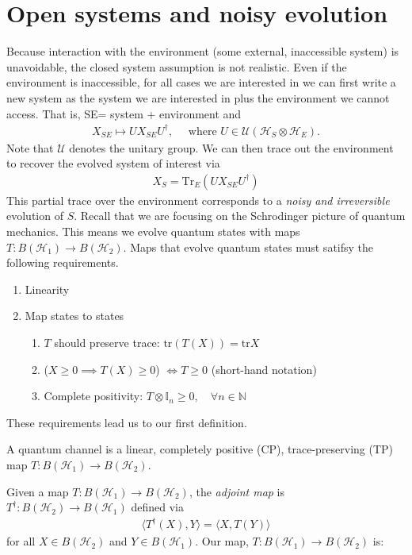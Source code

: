 \documentclass[../../note.tex]{subfiles}
\begin{document}
\section{Open systems and noisy evolution}
Because interaction with the environment (some external, inaccessible system) is unavoidable, the closed system assumption is not realistic. Even if the environment is inaccessible, for all cases we are interested in we can first write a new system as the system we are interested in plus the environment we cannot access. That is, SE= system + environment and 
\begin{align}
X_{SE} \mapsto U X_{SE} U^{\dagger}, \quad \text{ where } U\in \mathcal{U}(\mathcal{H}_S\otimes \mathcal{H}_E).
\end{align}
Note that $\mathcal{U}$ denotes the unitary group. We can then trace out the environment to recover the evolved system of interest via
\begin{align}
    X_S = \text{Tr}_E (U X_{SE} U^{\dagger})
\end{align}
This partial trace over the environment corresponds to a \textit{noisy and irreversible} evolution of $S$. Recall that we are focusing on the Schrodinger picture of quantum mechanics. This means we evolve quantum states with maps $T:B(\mathcal{H}_1) \rightarrow B(\mathcal{H}_2)$. Maps that evolve quantum states must satifsy the following requirements. 
\begin{enumerate}
    \item Linearity
    \item Map states to states
    \begin{enumerate}
        \item $T$ should preserve trace: $\text{tr}(T(X))=\text{tr}X$
        \item ($X\geq 0 \implies T(X) \geq 0$) $\Leftrightarrow T \geq 0$ (short-hand notation)
        \item Complete positivity: $T\otimes \mathbb{I}_n \geq 0, \quad \forall n\in \mathbb{N}$
    \end{enumerate}
\end{enumerate}
These requirements lead us to our first definition. 
\begin{definition}
A quantum channel is a linear, completely positive (CP), trace-preserving (TP) map $T: B(\mathcal{H}_1)\rightarrow B(\mathcal{H}_2)$.
\end{definition}

Given a map $T: B(\mathcal{H}_1)\rightarrow B(\mathcal{H}_2)$, the \textit{adjoint map} is $T^{\dagger}:B(\mathcal{H}_2)\rightarrow B(\mathcal{H}_1)$ defined via
\begin{align}
    \langle T^{\dagger}(X),Y \rangle = \langle X, T(Y) \rangle 
\end{align}
for all $X\in B(\mathcal{H}_2)$ and $Y\in B(\mathcal{H}_1)$. Our map, $T: B(\mathcal{H}_1)\rightarrow B(\mathcal{H}_2)$ is: 
\end{document}
